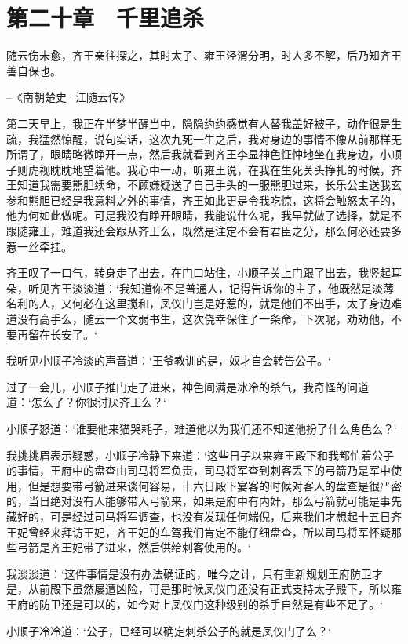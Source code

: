 \chapter{第二十章　千里追杀}

随云伤未愈，齐王亲往探之，其时太子、雍王泾渭分明，时人多不解，后乃知齐王善自保也。

--《南朝楚史·江随云传》

第二天早上，我正在半梦半醒当中，隐隐约约感觉有人替我盖好被子，动作很是生疏，我猛然惊醒，说句实话，这次九死一生之后，我对身边的事情不像从前那样无所谓了，眼睛略微睁开一点，然后我就看到齐王李显神色怔忡地坐在我身边，小顺子则虎视眈眈地望着他。我心中一动，听雍王说，在我在生死关头挣扎的时候，齐王知道我需要熊胆续命，不顾嫌疑送了自己手头的一服熊胆过来，长乐公主送我玄参和熊胆已经是我意料之外的事情，齐王如此更是令我吃惊，这将会触怒太子的，他为何如此做呢。可是我没有睁开眼睛，我能说什么呢，我早就做了选择，就是不跟随雍王，难道我还会跟从齐王么，既然是注定不会有君臣之分，那么何必还要多惹一丝牵挂。

齐王叹了一口气，转身走了出去，在门口站住，小顺子关上门跟了出去，我竖起耳朵，听见齐王淡淡道：‘我知道你不是普通人，记得告诉你的主子，他既然是淡薄名利的人，又何必在这里搅和，凤仪门岂是好惹的，就是他们不出手，太子身边难道没有高手么，随云一个文弱书生，这次侥幸保住了一条命，下次呢，劝劝他，不要再留在长安了。‘

我听见小顺子冷淡的声音道：‘王爷教训的是，奴才自会转告公子。‘

过了一会儿，小顺子推门走了进来，神色间满是冰冷的杀气，我奇怪的问道道：‘怎么了？你很讨厌齐王么？‘

小顺子怒道：‘谁要他来猫哭耗子，难道他以为我们还不知道他扮了什么角色么？‘

我挑挑眉表示疑惑，小顺子冷静下来道：‘这些日子以来雍王殿下和我都忙着公子的事情，王府中的盘查由司马将军负责，司马将军查到刺客丢下的弓箭乃是军中使用，但是想要带弓箭进来谈何容易，十六日殿下宴客的时候对客人的盘查是很严密的，当日绝对没有人能够带入弓箭来，如果是府中有内奸，那么弓箭就可能是事先藏好的，可是经过司马将军调查，也没有发现任何端倪，后来我们才想起十五日齐王妃曾经来拜访王妃，齐王妃的车驾我们肯定不能仔细盘查，所以司马将军怀疑那些弓箭是齐王妃带了进来，然后供给刺客使用的。‘

我淡淡道：‘这件事情是没有办法确证的，唯今之计，只有重新规划王府防卫才是，从前殿下虽然屡遭凶险，可是那时候凤仪门还没有正式支持太子殿下，所以雍王府的防卫还是可以的，如今对上凤仪门这种级别的杀手自然是有些不足了。‘

小顺子冷冷道：‘公子，已经可以确定刺杀公子的就是凤仪门了么？‘

